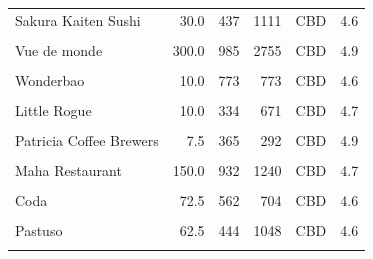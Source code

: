 \documentclass[11pt,a4paper,]{article}
\begin{document}
\begin{table}[!h]
\begin{tabular}[t]{l|r|r|r|l|l}
\hline
\cellcolor{gray!6}{Le Petit Gateau} & \cellcolor{gray!6}{15.0} & \cellcolor{gray!6}{352} & \cellcolor{gray!6}{519} & \cellcolor{gray!6}{CBD} & \cellcolor{gray!6}{4.9}\\
\hline
Sakura Kaiten Sushi & 30.0 & 437 & 1111 & CBD & 4.6\\
\hline
\cellcolor{gray!6}{Hakata Gensuke Ramen Professionals} & \cellcolor{gray!6}{25.0} & \cellcolor{gray!6}{845} & \cellcolor{gray!6}{1189} & \cellcolor{gray!6}{CBD} & \cellcolor{gray!6}{4.7}\\
\hline
Vue de monde & 300.0 & 985 & 2755 & CBD & 4.9\\
\hline
\cellcolor{gray!6}{Shoya Nouvelle Wafu Cuisine} & \cellcolor{gray!6}{70.0} & \cellcolor{gray!6}{391} & \cellcolor{gray!6}{1316} & \cellcolor{gray!6}{CBD} & \cellcolor{gray!6}{4.7}\\
\hline
Wonderbao & 10.0 & 773 & 773 & CBD & 4.6\\
\hline
\cellcolor{gray!6}{Brother Baba Budan} & \cellcolor{gray!6}{7.5} & \cellcolor{gray!6}{545} & \cellcolor{gray!6}{446} & \cellcolor{gray!6}{CBD} & \cellcolor{gray!6}{4.6}\\
\hline
Little Rogue & 10.0 & 334 & 671 & CBD & 4.7\\
\hline
\cellcolor{gray!6}{Purple Peanuts Japanese Cafe} & \cellcolor{gray!6}{20.0} & \cellcolor{gray!6}{490} & \cellcolor{gray!6}{661} & \cellcolor{gray!6}{CBD} & \cellcolor{gray!6}{4.6}\\
\hline
Patricia Coffee Brewers & 7.5 & 365 & 292 & CBD & 4.9\\
\hline
\cellcolor{gray!6}{Shimbashi Soba \& Sake Bar} & \cellcolor{gray!6}{27.5} & \cellcolor{gray!6}{368} & \cellcolor{gray!6}{923} & \cellcolor{gray!6}{CBD} & \cellcolor{gray!6}{4.6}\\
\hline
Maha Restaurant & 150.0 & 932 & 1240 & CBD & 4.7\\
\hline
\cellcolor{gray!6}{La Belle Miette} & \cellcolor{gray!6}{10.0} & \cellcolor{gray!6}{477} & \cellcolor{gray!6}{427} & \cellcolor{gray!6}{CBD} & \cellcolor{gray!6}{4.8}\\
\hline
Coda & 72.5 & 562 & 704 & CBD & 4.6\\
\hline
\cellcolor{gray!6}{Punch Lane} & \cellcolor{gray!6}{75.0} & \cellcolor{gray!6}{430} & \cellcolor{gray!6}{862} & \cellcolor{gray!6}{CBD} & \cellcolor{gray!6}{4.8}\\
\hline
Pastuso & 62.5 & 444 & 1048 & CBD & 4.6\\
\hline
\cellcolor{gray!6}{Aka Siro} & \cellcolor{gray!6}{40.0} & \cellcolor{gray!6}{238} & \cellcolor{gray!6}{491} & \cellcolor{gray!6}{Collingwood} & \cellcolor{gray!6}{4.8}\\

\end{tabular}
\end{table}
\end{document}

